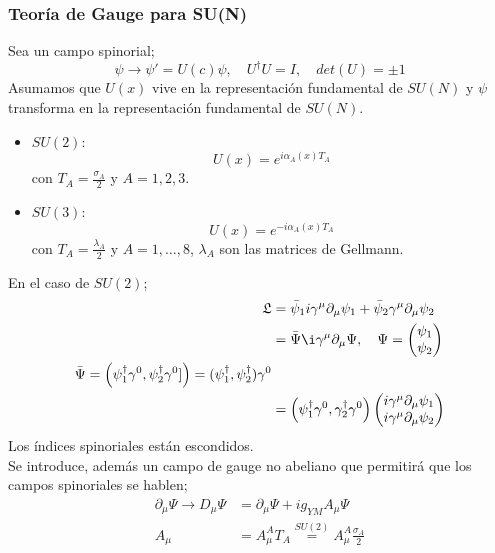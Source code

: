 \documentclass[../main.tex]{subfiles}
\begin{document}
\subsubsection{Teoría de Gauge para SU(N)}
Sea un campo spinorial;
\begin{equation}
  \psi \rightarrow \psi'=U(c)\psi,\quad U^\dagger U = I,\quad det(U)=\pm 1
 \end{equation}
Asumamos que $U(x)$ vive en la representación fundamental de $SU(N)$ y $\psi$ transforma en la representación fundamental de $SU(N)$.
\begin{itemize}
  \item $SU(2)$:
  \begin{equation}
    U(x) = e^{i\alpha_A(x)T_A}
   \end{equation}
   con $T_A=\frac{\sigma_A}{2}$ y $A=1,2,3$. 
   \item $SU(3)$:
   \begin{equation}
     U(x) = e^{-i\alpha_A(x)T_A}
    \end{equation}
    con $T_A=\frac{\lambda_A}{2}$ y $A=1,\dots,8$, $\lambda_A$ son las matrices de Gellmann. 
\end{itemize}
En el caso de $SU(2)$;
\begin{align*}
  \mathfrak{L}&  = \bar{\psi}_1i\gamma^\mu \partial_\mu \psi_1 + \bar{\psi}_2\gamma^\mu \partial_\mu \psi_2 \\
  & = \bar{\Psi}\i\gamma^\mu \partial_\mu \Psi, \quad \Psi=\begin{pmatrix}
    \psi_1 \\ \psi_2
  \end{pmatrix}
  \\
  \bar{\Psi} = \left( \psi_1^\dagger \gamma^0, \psi^\dagger_2\gamma^0] \right) = (\psi_1^\dagger,\psi_2^\dagger)\gamma^0 \\
  & = \left( \psi_1^\dagger\gamma^0 , \gamma_2^\dagger\gamma^0 \right) \begin{pmatrix}
    i\gamma^\mu \partial_\mu \psi_1 \\ i\gamma^\mu \partial_\mu \psi_2
  \end{pmatrix}
\end{align*}
Los índices spinoriales están escondidos. \\
Se introduce, además un campo de gauge no abeliano que permitirá que los campos spinoriales se hablen;
\begin{align*}
  \partial_\mu \Psi \rightarrow D_\mu \Psi& = \partial_\mu \Psi + ig_{YM}A_\mu \Psi \\
  A_\mu & = A^A_\mu T_A \stackrel{SU(2)}{=} A^A_\mu \frac{\sigma_A}{2}
\end{align*}
\end{document}
